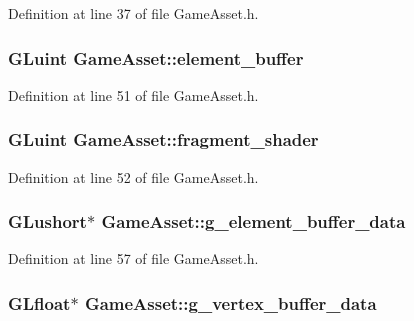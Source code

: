 Definition at line 37 of file Game\-Asset.\-h.

\hypertarget{classGameAsset_a5e005ff1d4280e73f67446353e78fe43}{
\subsubsection[{element\-\_\-buffer}]{\setlength{\rightskip}{0pt plus 5cm}G\-Luint Game\-Asset\-::element\-\_\-buffer\hspace{0.3cm}{\ttfamily [protected]}}}\label{classGameAsset_a5e005ff1d4280e73f67446353e78fe43}


Definition at line 51 of file Game\-Asset.\-h.

\hypertarget{classGameAsset_ab62d9e2547537bd89eeae057a402a895}{
\subsubsection[{fragment\-\_\-shader}]{\setlength{\rightskip}{0pt plus 5cm}G\-Luint Game\-Asset\-::fragment\-\_\-shader\hspace{0.3cm}{\ttfamily [protected]}}}\label{classGameAsset_ab62d9e2547537bd89eeae057a402a895}


Definition at line 52 of file Game\-Asset.\-h.

\hypertarget{classGameAsset_ab859393c9158c8bda39cd100475fee25}{
\subsubsection[{g\-\_\-element\-\_\-buffer\-\_\-data}]{\setlength{\rightskip}{0pt plus 5cm}G\-Lushort$\ast$ Game\-Asset\-::g\-\_\-element\-\_\-buffer\-\_\-data\hspace{0.3cm}{\ttfamily [protected]}}}\label{classGameAsset_ab859393c9158c8bda39cd100475fee25}


Definition at line 57 of file Game\-Asset.\-h.

\hypertarget{classGameAsset_ae1d682ecf84d9cd3f91a8c870acf2777}{
\subsubsection[{g\-\_\-vertex\-\_\-buffer\-\_\-data}]{\setlength{\rightskip}{0pt plus 5cm}G\-Lfloat$\ast$ Game\-Asset\-::g\-\_\-vertex\-\_\-buffer\-\_\-data\hspace{0.3cm}{\ttfamily [protected]}}}\label{classGameAsset_ae1d682ecf84d9cd3f91a8c870acf2777}


